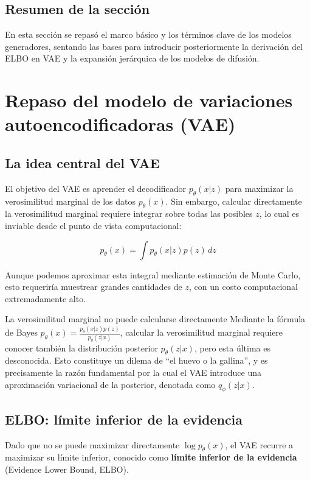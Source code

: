 \documentclass[a4paper]{article}
\begin{document}
\subsection{Resumen de la sección}

En esta sección se repasó el marco básico y los términos clave de los modelos generadores, sentando las bases para introducir posteriormente la derivación del ELBO en VAE y la expansión jerárquica de los modelos de difusión.
\section{Repaso del modelo de variaciones autoencodificadoras (VAE)}

\subsection{La idea central del VAE}

El objetivo del VAE es aprender el decodificador $p_\theta(x|z)$ para maximizar la verosimilitud marginal de los datos $p_\theta(x)$. Sin embargo, calcular directamente la verosimilitud marginal requiere integrar sobre todas las posibles $z$, lo cual es inviable desde el punto de vista computacional:

$$p_\theta(x) = \int p_\theta(x|z) p(z) \, dz$$

Aunque podemos aproximar esta integral mediante estimación de Monte Carlo, esto requeriría muestrear grandes cantidades de $z$, con un costo computacional extremadamente alto.

\begin{warningbox}{La verosimilitud marginal no puede calcularse directamente}
Mediante la fórmula de Bayes $p_\theta(x) = \frac{p_\theta(x|z) p(z)}{p_\theta(z|x)}$, calcular la verosimilitud marginal requiere conocer también la distribución posterior $p_\theta(z|x)$, pero esta última es desconocida. Esto constituye un dilema de ``el huevo o la gallina'', y es precisamente la razón fundamental por la cual el VAE introduce una aproximación variacional de la posterior, denotada como $q_\phi(z|x)$.
\end{warningbox}

\subsection{ELBO: límite inferior de la evidencia}

Dado que no se puede maximizar directamente $\log p_\theta(x)$, el VAE recurre a maximizar su límite inferior, conocido como \textbf{límite inferior de la evidencia} (Evidence Lower Bound, ELBO).
\end{document}
